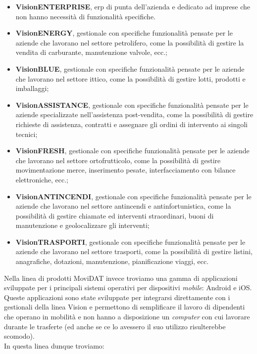 \begin{itemize}
      \item \textbf{VisionENTERPRISE}, \gls{erp} di punta dell'azienda e dedicato ad imprese che non hanno necessità di funzionalità 
      specifiche.
      \item \textbf{VisionENERGY}, gestionale con specifiche funzionalità pensate per le aziende che lavorano nel settore petrolifero, 
      come la possibilità di gestire la vendita di carburante, manutenzione valvole, ecc.;
      \item \textbf{VisionBLUE}, gestionale con specifiche funzionalità pensate per le aziende che lavorano nel settore ittico, 
      come la possibilità di gestire lotti, prodotti e imballaggi;
      \item \textbf{VisionASSISTANCE}, gestionale con specifiche funzionalità pensate per le aziende specializzate nell'assistenza post-vendita, 
      come la possibilità di gestire richieste di assistenza, contratti e assegnare gli ordini di intervento ai 
      singoli tecnici;
      \item \textbf{VisionFRESH}, gestionale con specifiche funzionalità pensate per le aziende che lavorano nel settore ortofrutticolo, 
      come la possibilità di gestire movimentazione merce, inserimento pesate, interfacciamento con bilance elettroniche, ecc.;
      \item \textbf{VisionANTINCENDI}, gestionale con specifiche funzionalità pensate per le aziende che lavorano nel settore antincendi e antinfortunistica, 
      come la possibilità di gestire chiamate ed interventi straordinari, buoni di manutenzione e geolocalizzare gli interventi;
      \item \textbf{VisionTRASPORTI}, gestionale con specifiche funzionalità pensate per le aziende che lavorano nel settore trasporti, 
      come la possibilità di gestire listini, anagrafiche, dotazioni, manutenzione, pianificazione viaggi, ecc.
\end{itemize}
Nella linea di prodotti MoviDAT invece troviamo una gamma di applicazioni sviluppate per i principali sistemi operativi per dispositivi 
\textit{mobile}: Android e iOS. Queste applicazioni sono state sviluppate per integrarsi direttamente con i gestionali 
della linea Vision e permettono di semplificare il lavoro di dipendenti che operano in mobilità e non hanno a disposizione un 
\textit{computer} con cui lavorare durante le trasferte (ed anche se ce lo avessero il suo utilizzo risulterebbe scomodo).\\
In questa linea dunque troviamo:
